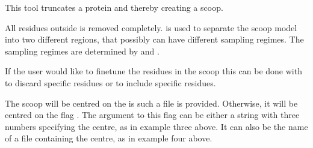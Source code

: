 \documentclass[letterpaper,10pt,english]{sphinxmanual}
\begin{document}
%
\begin{sphinxVerbatim}[commandchars=\\\{\}]
  
     
     
     
       
      
       
\end{sphinxVerbatim}


This tool truncates a protein and thereby creating a scoop.

All residues outside  is removed completely.  is used to separate the scoop model into two different regions, that possibly can have different sampling regimes. The sampling regimes are determined by  and .

If the user would like to finetune the residues in the scoop this can be done with  to discard specific residues or  to include specific residues.

The scoop will be centred on the  is such a file is provided. Otherwise, it will be centred on the flag . The argument to this flag can be either a string with three numbers specifying the centre, as in example three above. It can also be the name of a file containing the centre, as in example four above.
\end{document}
